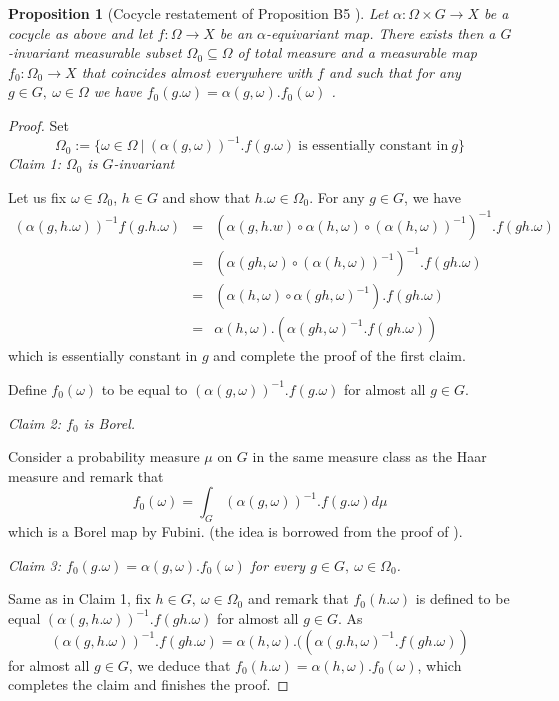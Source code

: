 \documentclass{amsart}
\numberwithin{equation}{section}
\newtheorem{prop}[thm]{Proposition}
\theoremstyle{definition}
\begin{document}
\begin{prop}[Cocycle restatement of Proposition B5 \cite{Zimmer}]\label{prop_Theorem_B5}
Let $\alpha:\Omega\times G\rightarrow X$ be a cocycle as above and let $f:\Omega\rightarrow X$ be an $\alpha$-equivariant map. There exists then a $G$-invariant measurable subset $\Omega_0\subseteq \Omega$ of total measure and a measurable map $f_0:\Omega_0\rightarrow X$ that coincides almost everywhere with $f$ and such that for any $g\in G,\ \omega\in \Omega$ we have $f_0(g.\omega)=\alpha(g,\omega).f_0(\omega)$
     .
\end{prop}
\begin{proof}
    Set 
    \[
    \Omega_0:=\{\omega\in\Omega\ | \ (\alpha(g,\omega))^{-1}.f(g.\omega)\ \text{is essentially constant in}\ g \}
    \]
    \textit{Claim 1: $\Omega_0$ is $G$-invariant}\par 
    Let us fix $\omega\in \Omega_0$, $h\in G$ and show that $h.\omega\in \Omega_0$. For any $g\in G$, we have 
    \begin{eqnarray*}
        (\alpha(g,h.\omega))^{-1}f(g.h.\omega)&=& (\alpha(g,h.w)\circ\alpha(h,\omega)\circ(\alpha(h,\omega))^{-1})^{-1}.f(gh.\omega)\\
        &=&(\alpha(gh,\omega)\circ(\alpha(h,\omega))^{-1})^{-1}.f(gh.\omega)\\
        &=&(\alpha(h,\omega)\circ \alpha(gh,\omega)^{-1}).f(gh.\omega)\\
        &=&\alpha(h,\omega).(\alpha(gh,\omega)^{-1}.f(gh.\omega))
    \end{eqnarray*}
    which is essentially constant in $g$ and complete the proof of the first claim.\par 
    Define $f_0(\omega)$ to be equal to $(\alpha(g,\omega))^{-1}.f(g.\omega)$ for almost all $g\in G$. \par 
    \noindent\textit{Claim 2: $f_0$ is Borel.} \par Consider a probability measure $\mu$ on $G$ in the same measure class as the Haar measure and remark that 
    \[
    f_0(\omega)=\int_{G}(\alpha(g,\omega))^{-1}.f(g.\omega)d\mu 
    \]
    which is a Borel map by Fubini. (the idea is borrowed from the proof of \cite[Theorem B2]{Zimmer}).\par 
    \noindent\textit{Claim 3: $f_0(g.\omega)=\alpha(g,\omega).f_0(\omega)$ for every $g\in G,\ \omega\in \Omega_0$.}\par 
    Same as in Claim 1, fix $h\in G, \ \omega\in \Omega_0$ and remark that $f_0(h.\omega)$ is defined to be equal $(\alpha(g,h.\omega))^{-1}.f(gh.\omega)$ for almost all $g\in G$. As 
    \[
    (\alpha(g,h.\omega))^{-1}.f(gh.\omega)=\alpha(h,\omega).((\alpha(g.h,\omega)^{-1}.f(gh.\omega))
    \]
    for almost all $g\in G$, we deduce that $f_0(h.\omega)=\alpha(h,\omega).f_0(\omega)$, which completes the claim and finishes the proof.
\end{proof}
\end{document}
